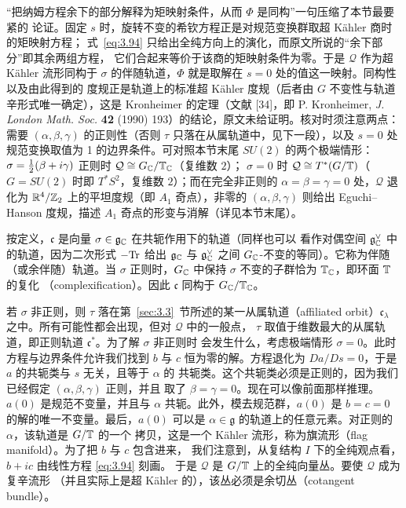 \begin{yizhu}[含糊点拨]
“把纳姆方程余下的部分解释为矩映射条件，从而 $\Phi$ 是同构”一句压缩了本节最要紧的
论证。固定 $s$ 时，旋转不变的希钦方程正是对规范变换群取超 Kähler 商时的矩映射方程；
式~\eqref{eq:3.94} 只给出全纯方向上的演化，而原文所说的“余下部分”即其余两组方程，
它们合起来等价于该商的矩映射条件为零。于是 ${\mathcal Q}$ 作为超 Kähler 流形同构于
$\sigma$ 的伴随轨道，$\Phi$ 就是取解在 $s=0$ 处的值这一映射。同构性以及由此得到的
度规正是轨道上的标准超 Kähler 度规（后者由 $G$ 不变性与轨道辛形式唯一确定），这是
Kronheimer 的定理（文献 [34]，即 P. Kronheimer, \textit{J. London Math. Soc.}
\textbf{42} (1990) 193）的结论，原文未给证明。核对时须注意两点：需要
$(\alpha,\beta,\gamma)$ 的正则性（否则 $\tau$ 只落在从属轨道中，见下一段），以及
$s=0$ 处规范变换取值为 1 的边界条件。可对照本节末尾 $SU(2)$ 的两个极端情形：
$\sigma=\frac{1}{2}(\beta+i\gamma)$ 正则时 ${\mathcal Q}\cong G_{\mathbb{C}}/{\mathbb{T}}_{\mathbb{C}}$（复维数 $2$）；
$\sigma=0$ 时 ${\mathcal Q}\cong T^*(G/{\mathbb{T}})$（$G=SU(2)$ 时即 $T^*S^2$，复维数 $2$）；而在完全非正则的 $\alpha=\beta=\gamma=0$ 处，${\mathcal Q}$ 退化为 ${\mathbb{R}}^4/{\mathbb{Z}}_2$ 上的平坦度规（即 $A_1$ 奇点），非零的 $(\alpha,\beta,\gamma)$ 则给出 Eguchi--Hanson 度规，描述 $A_1$ 奇点的形变与消解（详见本节末尾）。
\end{yizhu}

按定义，$\mathfrak c$ 是向量 $\sigma\in\mathfrak g_{\mathbb{C}}$ 在共轭作用下的轨道（同样也可以
看作对偶空间 $\mathfrak g_{\mathbb{C}}^\vee$ 中的轨道，因为二次形式 $-{\rm Tr}$ 给出 $\mathfrak g_{\mathbb{C}}$
与 $\mathfrak g_{\mathbb{C}}^\vee$ 之间 $G_{\mathbb{C}}$-不变的等同）。它称为伴随（或余伴随）轨道。当
$\sigma$ 正则时，$G_{\mathbb{C}}$ 中保持 $\sigma$ 不变的子群恰为 ${\mathbb{T}}_{\mathbb{C}}$，即环面 ${\mathbb{T}}$ 的复化
（complexification）。因此 $\mathfrak c$ 同构于 $G_{\mathbb{C}}/{\mathbb{T}}_{\mathbb{C}}$。

若 $\sigma$ 非正则，则 $\tau$ 落在第~\ref{sec:3.3}~节所述的某一从属轨道（affiliated
orbit）$\mathfrak c_\lambda$ 之中。所有可能性都会出现，但对 ${\mathcal Q}$ 中的一般点，
$\tau$ 取值于维数最大的从属轨道，即正则轨道 $\mathfrak c^*$。为了解 $\sigma$ 非正则时
会发生什么，考虑极端情形 $\sigma=0$。此时方程与边界条件允许我们找到 $b$ 与 $c$
恒为零的解。方程退化为 $Da/Ds=0$，于是 $a$ 的共轭类与 $s$ 无关，且等于 $\alpha$ 的
共轭类。这个共轭类必须是正则的，因为我们已经假定 $(\alpha,\beta,\gamma)$ 正则，并且
取了 $\beta=\gamma=0$。现在可以像前面那样推理。$a(0)$ 是规范不变量，并且与 $\alpha$
共轭。此外，模去规范群，$a(0)$ 是 $b=c=0$ 的解的唯一不变量。最后，$a(0)$ 可以是
$\alpha\in\mathfrak g$ 的轨道上的任意元素。对正则的 $\alpha$，该轨道是 $G/{\mathbb{T}}$ 的一个
拷贝，这是一个 Kähler 流形，称为旗流形（flag manifold）。为了把 $b$ 与 $c$ 包含进来，
我们注意到，从复结构 $I$ 下的全纯观点看，$b+ic$ 由线性方程 \eqref{eq:3.94} 刻画。
于是 ${\mathcal Q}$ 是 $G/{\mathbb{T}}$ 上的全纯向量丛。要使 ${\mathcal Q}$ 成为复辛流形
（并且实际上是超 Kähler 的），该丛必须是余切丛（cotangent bundle）。

